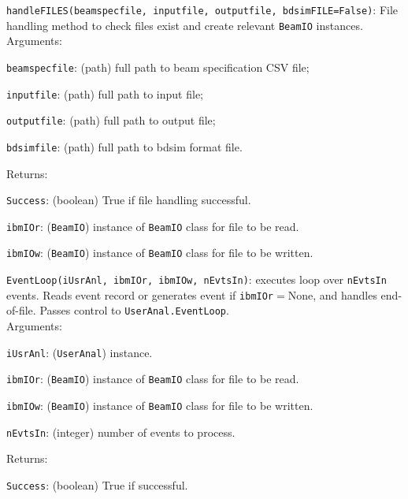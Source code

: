 \begin{description}
  \item{\texttt{handleFILES(beamspecfile, inputfile, outputfile, bdsimFILE=False)}}: 
    File handling method to check files exist and create
    relevant \texttt{BeamIO} instances. \\
    Arguments:
    \begin{description}
      \item{\texttt{beamspecfile}}: (path) full path to beam
                                    specification CSV file;
      \item{\texttt{inputfile}}:    (path) full path to input file;
      \item{\texttt{outputfile}}:   (path) full path to output file;
      \item{\texttt{bdsimfile}}:    (path) full path to bdsim format file.
    \end{description}
    Returns:
    \begin{description}
      \item{\texttt{Success}}: (boolean) True if file handling successful.
      \item{\texttt{ibmIOr}}:  (\texttt{BeamIO}) instance
                               of \texttt{BeamIO} class for file to be read.
      \item{\texttt{ibmIOw}}:  (\texttt{BeamIO}) instance
                               of \texttt{BeamIO} class for file to be
                               written. \\
    \end{description}
    
  \item{\texttt{EventLoop(iUsrAnl, ibmIOr, ibmIOw, nEvtsIn)}}:
    executes loop over \texttt{nEvtsIn} events.
    Reads event record or generates event if \texttt{ibmIOr}$=$None,
    and handles end-of-file.
    Passes control to \texttt{UserAnal.EventLoop}.   \\
    Arguments:
    \begin{description}
      \item{\texttt{iUsrAnl}}: (\texttt{UserAnal}) instance.
      \item{\texttt{ibmIOr}}:  (\texttt{BeamIO}) instance
                               of \texttt{BeamIO} class for file to be read.
      \item{\texttt{ibmIOw}}:  (\texttt{BeamIO}) instance
                               of \texttt{BeamIO} class for file to be
                               written.
      \item{\texttt{nEvtsIn}}: (integer) number of events to
                               process.
    \end{description}
    Returns:
    \begin{description}
      \item{\texttt{Success}}: (boolean) True if successful.
    \end{description}
\end{description}

